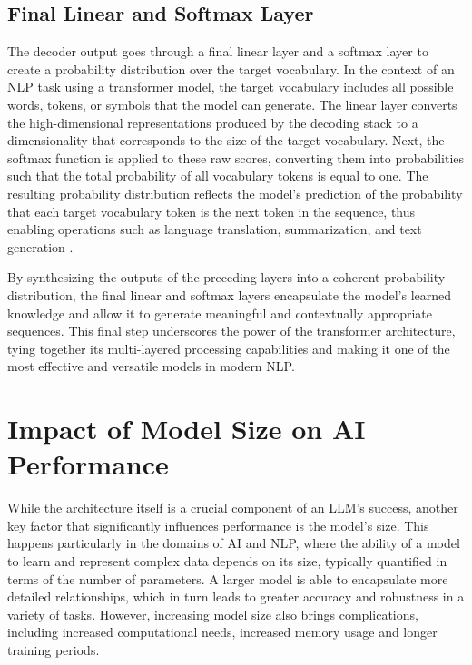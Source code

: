 \subsection{Final Linear and Softmax Layer}

The decoder output goes through a final linear layer and a softmax layer to create a probability distribution over the target vocabulary. In the context of an NLP task using a transformer model, the target vocabulary includes all possible words, tokens, or symbols that the model can generate. The linear layer converts the high-dimensional representations produced by the decoding stack to a dimensionality that corresponds to the size of the target vocabulary. Next, the softmax function is applied to these raw scores, converting them into probabilities such that the total probability of all vocabulary tokens is equal to one. The resulting probability distribution reflects the model's prediction of the probability that each target vocabulary token is the next token in the sequence, thus enabling operations such as language translation, summarization, and text generation \cite{jozefowicz2016exploring}.

By synthesizing the outputs of the preceding layers into a coherent probability distribution, the final linear and softmax layers encapsulate the model's learned knowledge and allow it to generate meaningful and contextually appropriate sequences. This final step underscores the power of the transformer architecture, tying together its multi-layered processing capabilities and making it one of the most effective and versatile models in modern NLP.

\section{Impact of Model Size on AI Performance}

While the architecture itself is a crucial component of an LLM’s success, another key factor that significantly influences performance is the model’s size. This happens particularly in the domains of AI and NLP, where the ability of a model to learn and represent complex data depends on its size, typically quantified in terms of the number of parameters. A larger model is able to encapsulate more detailed relationships, which in turn leads to greater accuracy and robustness in a variety of tasks. However, increasing model size also brings complications, including increased computational needs, increased memory usage and longer training periods.

